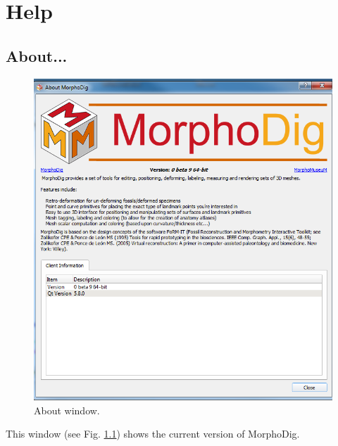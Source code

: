 
\chapter{Help}

\minitoc 


\section{About...} 
\begin{figure}
  \centering
  \includegraphics[scale=0.5]{images/about/About.png} 
	\caption{About window.}
\label{about}
 
\end{figure}

This window (see Fig. \ref{about}) shows the current version of MorphoDig.
